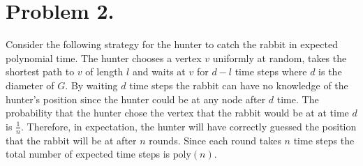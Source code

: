 \documentclass[12pt]{article}
\begin{document}
\pagestyle{plain}
\titleformat{\subsection}[runin]
  {\normalfont\large\bfseries}{\thesubsection}{1em}{}
\titleformat{\subsubsection}[runin]
  {\normalfont\large\bfseries}{\thesubsubsection}{1em}{}

\section*{Problem 2.}
Consider the following strategy for the hunter to catch the rabbit in
expected polynomial time. The hunter chooses a vertex $v$ uniformly at random,
takes the shortest path to $v$ of length $l$ and waits at $v$ for $d-l$ time
steps where $d$ is the diameter of $G$. By waiting $d$ time steps the rabbit
can have no knowledge of the hunter's position since the hunter could be at any
node after $d$ time. The probability that the hunter chose the vertex that the
rabbit would be at at time $d$ is $\frac{1}{n}$. Therefore, in expectation, the
hunter will have correctly guessed the position that the rabbit will be at after
$n$ rounds. Since each round takes $n$ time steps the total number of expected
time steps is $\text{poly}(n)$.
\end{document}
